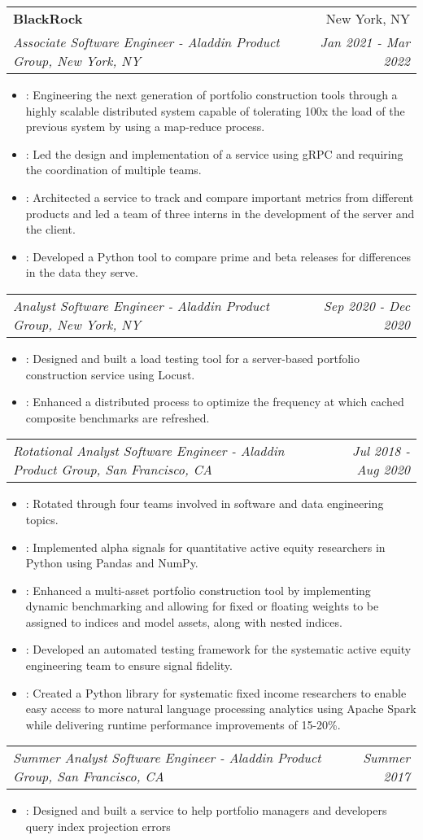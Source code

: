 \documentclass[letterpaper,10pt]{article}
\makeatletter
\newcommand{\resumeItem}[2]{
  \item\small{
    \textbf{#1}{: #2 \vspace{-2pt}}
  }
}
\newcommand{\resumeSubheading}[4]{
  \vspace{-1pt}\item
    \begin{tabular*}{0.97\textwidth}[t]{l@{\extracolsep{\fill}}r}
      \textbf{#1} & #2 \\
      \textit{\small#3} & \textit{\small #4} \\
    \end{tabular*}\vspace{-5pt}
}
\newcommand{\resumeSubSubheading}[2]{
    \begin{tabular*}{0.97\textwidth}{l@{\extracolsep{\fill}}r}
      \textit{\small#1} & \textit{\small #2} \\
    \end{tabular*}\vspace{-5pt}
}
\newcommand{\resumeItemListStart}{\begin{itemize}}
\newcommand{\resumeItemListEnd}{\end{itemize}\vspace{-5pt}}
\makeatother
\begin{document}
    \resumeSubheading
      {BlackRock}{New York, NY}
      {Associate Software Engineer - Aladdin Product Group, New York, NY}{Jan 2021 - Mar 2022}
      \resumeItemListStart
        \resumeItem{}{Engineering the next generation of portfolio construction tools through a highly scalable distributed system capable of tolerating 100x the load of the previous system by using a map-reduce process.}
        \resumeItem{}{Led the design and implementation of a service using gRPC and requiring the coordination of multiple teams.}
        \resumeItem{}{Architected a service to track and compare important metrics from different products and led a team of three interns in the development of the server and the client.}
        \resumeItem{}{Developed a Python tool to compare prime and beta releases for differences in the data they serve.}
      \resumeItemListEnd
      \resumeSubSubheading
      {Analyst Software Engineer - Aladdin Product Group, New York, NY}{Sep 2020 - Dec 2020}
      \resumeItemListStart
        \resumeItem{}{Designed and built a load testing tool for a server-based portfolio construction service using Locust.}
        \resumeItem{}{Enhanced a distributed process to optimize the frequency at which cached composite benchmarks are refreshed.}
      \resumeItemListEnd
      \resumeSubSubheading
      {Rotational Analyst Software Engineer - Aladdin Product Group, San Francisco, CA}{Jul 2018 - Aug 2020}
      \resumeItemListStart
        \resumeItem{}{Rotated through four teams involved in software and data engineering topics.}
        \resumeItem{}{Implemented alpha signals for quantitative active equity researchers in Python using Pandas and NumPy.}
        \resumeItem{}{Enhanced a multi-asset portfolio construction tool by implementing dynamic benchmarking and allowing for fixed or floating weights to be assigned to indices and model assets, along with nested indices.}
        \resumeItem{}{Developed an automated testing framework for the systematic active equity engineering team to ensure signal fidelity.}
        \resumeItem{}{Created a Python library for systematic fixed income researchers to enable easy access to more natural language processing analytics using Apache Spark while delivering runtime performance improvements of 15-20\%.}
      \resumeItemListEnd
      \resumeSubSubheading
      {Summer Analyst Software Engineer - Aladdin Product Group, San Francisco, CA}{Summer 2017}
      \resumeItemListStart
        \resumeItem{}{Designed and built a service to help portfolio managers and developers query index projection errors}
      \resumeItemListEnd
\end{document}
